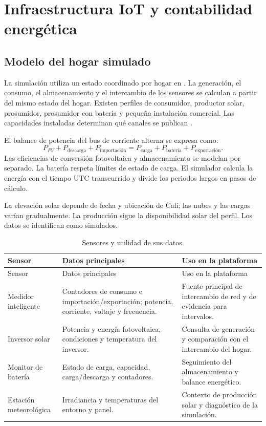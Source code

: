 \section{Infraestructura IoT y contabilidad energética}
\subsection{Modelo del hogar simulado}
La simulación utiliza un estado coordinado por hogar en . La generación, el consumo, el almacenamiento y el intercambio de los sensores se calculan a partir del mismo estado del hogar. Existen perfiles de consumidor, productor solar, prosumidor, prosumidor con batería y pequeña instalación comercial. Las capacidades instaladas determinan qué canales se publican \citep{iot}.

El balance de potencia del bus de corriente alterna se expresa como:
\begin{equation}
P_{PV}+P_{\text{descarga}}+P_{\text{importación}}=P_{\text{carga}}+P_{\text{batería}}+P_{\text{exportación}}.
\label{eq:balance}
\end{equation}
Las eficiencias de conversión fotovoltaica y almacenamiento se modelan por separado. La batería respeta límites de estado de carga. El simulador calcula la energía con el tiempo UTC transcurrido y divide los periodos largos en pasos de cálculo.

La elevación solar depende de fecha y ubicación de Cali; las nubes y las cargas varían gradualmente. La producción sigue la disponibilidad solar del perfil. Los datos se identifican como simulados.

\begin{longtable}{L{.22\linewidth}L{.35\linewidth}L{.32\linewidth}}
\caption{Sensores y utilidad de sus datos.}\label{tab:sensores}\\
\toprule Sensor & Datos principales & Uso en la plataforma \\ \midrule\endfirsthead
\toprule Sensor & Datos principales & Uso en la plataforma \\ \midrule\endhead
Medidor inteligente & Contadores de consumo e importación/exportación; potencia, corriente, voltaje y frecuencia. & Fuente principal de intercambio de red y de evidencia para intervalos.\\
Inversor solar & Potencia y energía fotovoltaica, condiciones y temperatura del inversor. & Consulta de generación y comparación con el intercambio del hogar.\\
Monitor de batería & Estado de carga, capacidad, carga/descarga y contadores. & Seguimiento del almacenamiento y balance energético.\\
Estación meteorológica & Irradiancia y temperaturas del entorno y panel. & Contexto de producción solar y diagnóstico de la simulación.\\
\bottomrule
\end{longtable}

